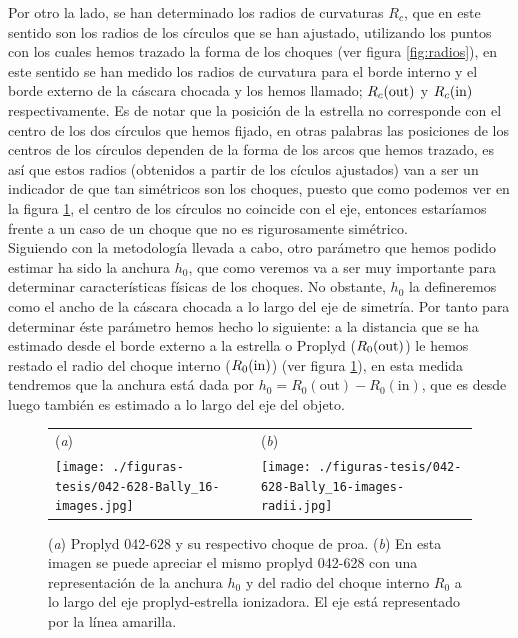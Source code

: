 Por otro la lado, se han determinado los radios de curvaturas \(R_{c}\), que en este sentido son los radios de los círculos que se han ajustado, utilizando los puntos con los cuales hemos trazado la forma de los choques (ver figura \ref{fig:radios}), en este sentido se han medido los radios de curvatura para el borde interno y el borde externo de la cáscara chocada y los hemos llamado; \(R_{c}(\mathrm{out}{})\) y \(R_{c}(\mathrm{in}{})\) respectivamente. Es de notar que la posición de la estrella no corresponde con el centro de los dos círculos que hemos fijado, en otras palabras las posiciones de los centros de los círculos dependen de la forma de los arcos que hemos trazado, es así que estos radios (obtenidos a partir de los cículos ajustados) van a ser un indicador de que tan simétricos son los choques, puesto que como podemos ver en la figura \ref{fig:anchura}, el centro de los círculos no coincide con el eje, entonces estaríamos frente a un caso de un choque que no es rigurosamente simétrico.\\

Siguiendo con la metodología llevada a cabo, otro parámetro que hemos podido estimar ha sido la anchura \(h_{0}\), que como veremos va a ser muy importante para determinar características físicas de los choques. No obstante, \(h_{0}\) la  defineremos como el ancho de la cáscara chocada a lo largo del eje de simetría. Por tanto para determinar éste parámetro hemos hecho lo siguiente: a la distancia que se ha estimado desde el borde externo a la estrella o Proplyd (\(R_{0}(\mathrm{out}{})\)) le hemos restado el radio del choque interno (\(R_{0}(\mathrm{in}{})\)) (ver figura \ref{fig:anchura}), en esta medida tendremos que la anchura está dada por \(h_{0} = R_{0}(\text{out}) - R_{0}(\text{in})\), que es desde luego también es estimado a lo largo del eje del objeto.

\begin{figure}[htp]
\centering
\begin{tabular}{l l}
(\textit{a}) & (\textit{b})  \\
  \texttt{[image: ./figuras-tesis/042-628-Bally\_16-images.jpg]}&
 \texttt{[image: ./figuras-tesis/042-628-Bally\_16-images-radii.jpg]}\\
\end{tabular}
\caption{(\textit{a}) Proplyd 042-628 y su respectivo choque de proa. (\textit{b}) En esta imagen se puede apreciar el mismo proplyd 042-628  con una representación de la anchura \(h_{0}\) y del radio del choque interno \(R_{0}\) a lo largo del eje proplyd-estrella ionizadora. El eje está representado por la línea amarilla.}\label{fig:anchura}
\end{figure}


